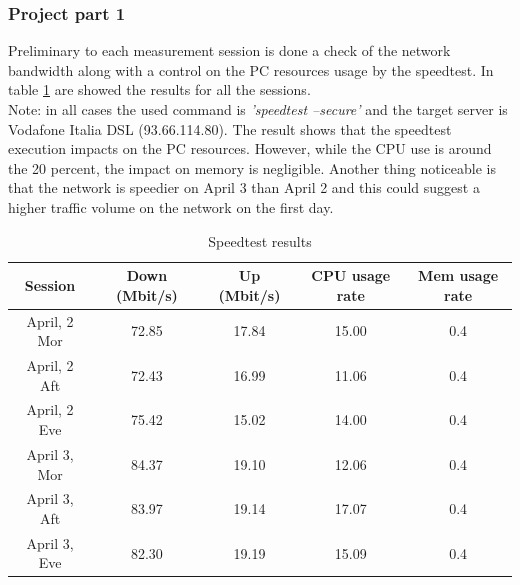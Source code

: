 \documentclass[a4paper,10pt]{article}
\begin{document}
\begin{multicols}{2}
\subsubsection{Project part 1}

Preliminary to each measurement session is done a check of the network bandwidth along with a control on the PC resources usage by
the speedtest. In table \ref{tab:speedtest_table} are showed the results for all the sessions.\\
Note: in all cases the used command is \textit{'speedtest --secure'} and the target server is Vodafone Italia DSL (93.66.114.80).
The result shows that the speedtest execution impacts on the PC resources. However, while the CPU use is around the 20 percent, the impact on memory 
is negligible. Another thing noticeable is that the network is speedier on April 3 than April 2 and this could suggest a higher traffic volume
on the network on the first day.

\end{multicols}
        \begin{table}[H]
                \centering
                \caption{\small Speedtest results}
                \vspace{0.3cm}
                \begin{tabular}{|c|c|c|c|c|}
                \hline
                \textbf{Session} & \textbf{Down (Mbit/s)} & \textbf{Up (Mbit/s) } & \textbf{CPU usage rate} & \textbf{Mem usage rate}\\ \hline
                April, 2 Mor & 72.85 & 17.84 & 15.00 & 0.4 \\ \hline
                April, 2 Aft & 72.43 & 16.99 & 11.06 & 0.4 \\ \hline
                April, 2 Eve & 75.42 & 15.02 & 14.00 & 0.4 \\ \hline
                April 3, Mor & 84.37 & 19.10 & 12.06 & 0.4\\ \hline
                April 3, Aft & 83.97 & 19.14 & 17.07 & 0.4\\ \hline
                April 3, Eve & 82.30 & 19.19 & 15.09 & 0.4\\ \hline
                \end{tabular}
                \label{tab:speedtest_table}
        \end{table}
\end{document}
